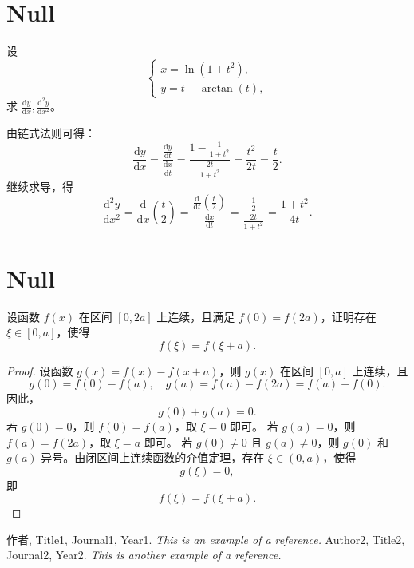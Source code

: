 \documentclass[11pt]{../../TexTemplate/elegantbook} %
\begin{document}
\section{Null}
设
\[
\begin{cases} x = \ln(1+t^{2}), \\ y=t-\arctan(t), \end{cases}
\]
求 \(\frac{\mathrm{d}y}{\mathrm{d}x}, \frac{\mathrm{d}^{2}y}{\mathrm{d}x^{2}}\)。

\begin{solution}
    由链式法则可得：
    \[
    \frac{\mathrm{d}y}{\mathrm{d}x} = \frac{\frac{\mathrm{d}y}{\mathrm{d}t}}{\frac{\mathrm{d}x}{\mathrm{d}t}} = \frac{1 - \frac{1}{1+t^{2}}}{\frac{2t}{1+t^{2}}} = \frac{t^{2}}{2t} = \frac{t}{2}.
    \]
    继续求导，得
    \[
    \frac{\mathrm{d}^{2}y}{\mathrm{d}x^{2}} = \frac{\mathrm{d}}{\mathrm{d}x} \left( \frac{t}{2} \right) = \frac{\frac{\mathrm{d}}{\mathrm{d}t} \left( \frac{t}{2} \right)}{\frac{\mathrm{d}x}{\mathrm{d}t}} = \frac{\frac{1}{2}}{\frac{2t}{1+t^{2}}} = \frac{1+t^{2}}{4t}.
    \]
\end{solution}

\section{Null}
设函数 \(f(x)\) 在区间 \([0,2a]\) 上连续，且满足 \(f(0)=f(2a)\)，证明存在 \(\xi \in [0,a]\)，使得
\[
f(\xi) = f(\xi + a).
\]

\begin{proof}
    设函数 \(g(x) = f(x) - f(x+a)\)，则 \(g(x)\) 在区间 \([0,a]\) 上连续，且
    \[
    g(0) = f(0) - f(a), \quad g(a) = f(a) - f(2a) = f(a) - f(0).
    \]
    因此，
    \[
    g(0) + g(a) = 0.
    \]
    若 \(g(0) = 0\)，则 \(f(0) = f(a)\)，取 \(\xi = 0\) 即可。
    \newline 若 \(g(a) = 0\)，则 \(f(a) = f(2a)\)，取 \(\xi = a\) 即可。
    \newline 若 \(g(0) \neq 0\) 且 \(g(a) \neq 0\)，则 \(g(0)\) 和 \(g(a)\) 异号。由闭区间上连续函数的介值定理，存在 \(\xi \in (0,a)\)，使得
    \[
    g(\xi) = 0,
    \]
    即
    \[
    f(\xi) = f(\xi + a).
    \]
\end{proof}


\begin{thebibliography}{99} 
 作者, Title1, Journal1, Year1. \emph{ This is an example of a reference.}
 Author2, Title2, Journal2, Year2. \emph{ This is another example of a reference.}
\end{thebibliography}
\end{document}
